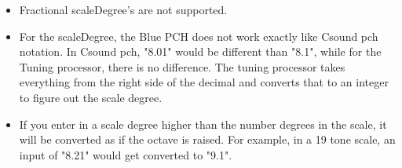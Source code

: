 \begin{itemize}
\item
  Fractional scaleDegree's are not supported.
\item
  For the scaleDegree, the Blue PCH does not work exactly like Csound
  pch notation. In Csound pch, "8.01" would be different than "8.1",
  while for the Tuning processor, there is no difference. The tuning
  processor takes everything from the right side of the decimal and
  converts that to an integer to figure out the scale degree.
\item
  If you enter in a scale degree higher than the number degrees in the
  scale, it will be converted as if the octave is raised. For example,
  in a 19 tone scale, an input of "8.21" would get converted to "9.1".
\end{itemize}
